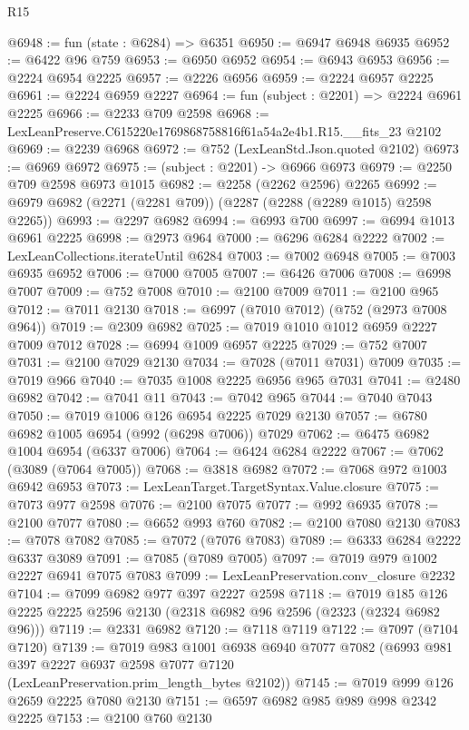 \begin{lexlean}{R15}
\begin{coremodule}
@6948 := fun (state : @6284) => @6351
@6950 := @6947 @6948 @6935
@6952 := @6422 @96 @759
@6953 := @6950 @6952
@6954 := @6943 @6953
@6956 := @2224 @6954 @2225
@6957 := @2226 @6956
@6959 := @2224 @6957 @2225
@6961 := @2224 @6959 @2227
@6964 := fun (subject : @2201) => @2224 @6961 @2225
@6966 := @2233 @709 @2598
@6968 := LexLeanPreserve.C615220e1769868758816f61a54a2e4b1.R15.__fits_23 @2102
@6969 := @2239 @6968
@6972 := @752 (LexLeanStd.Json.quoted @2102)
@6973 := @6969 @6972
@6975 := (subject : @2201) -> @6966 @6973
@6979 := @2250 @709 @2598 @6973 @1015
@6982 := @2258 (@2262 @2596) @2265
@6992 := @6979 @6982 (@2271 (@2281 @709)) (@2287 (@2288 (@2289 @1015) @2598 @2265))
@6993 := @2297 @6982
@6994 := @6993 @700
@6997 := @6994 @1013 @6961 @2225
@6998 := @2973 @964
@7000 := @6296 @6284 @2222
@7002 := LexLeanCollections.iterateUntil @6284
@7003 := @7002 @6948
@7005 := @7003 @6935 @6952
@7006 := @7000 @7005
@7007 := @6426 @7006
@7008 := @6998 @7007
@7009 := @752 @7008
@7010 := @2100 @7009
@7011 := @2100 @965
@7012 := @7011 @2130
@7018 := @6997 (@7010 @7012) (@752 (@2973 @7008 @964))
@7019 := @2309 @6982
@7025 := @7019 @1010 @1012 @6959 @2227 @7009 @7012
@7028 := @6994 @1009 @6957 @2225
@7029 := @752 @7007
@7031 := @2100 @7029 @2130
@7034 := @7028 (@7011 @7031) @7009
@7035 := @7019 @966
@7040 := @7035 @1008 @2225 @6956 @965 @7031
@7041 := @2480 @6982
@7042 := @7041 @11
@7043 := @7042 @965
@7044 := @7040 @7043
@7050 := @7019 @1006 @126 @6954 @2225 @7029 @2130
@7057 := @6780 @6982 @1005 @6954 (@992 (@6298 @7006)) @7029
@7062 := @6475 @6982 @1004 @6954 (@6337 @7006)
@7064 := @6424 @6284 @2222
@7067 := @7062 (@3089 (@7064 @7005))
@7068 := @3818 @6982
@7072 := @7068 @972 @1003 @6942 @6953
@7073 := LexLeanTarget.TargetSyntax.Value.closure
@7075 := @7073 @977 @2598
@7076 := @2100 @7075
@7077 := @992 @6935
@7078 := @2100 @7077
@7080 := @6652 @993 @760
@7082 := @2100 @7080 @2130
@7083 := @7078 @7082
@7085 := @7072 (@7076 @7083)
@7089 := @6333 @6284 @2222 @6337 @3089
@7091 := @7085 (@7089 @7005)
@7097 := @7019 @979 @1002 @2227 @6941 @7075 @7083
@7099 := LexLeanPreservation.conv_closure @2232
@7104 := @7099 @6982 @977 @397 @2227 @2598
@7118 := @7019 @185 @126 @2225 @2225 @2596 @2130 (@2318 @6982 @96 @2596 (@2323 (@2324 @6982 @96)))
@7119 := @2331 @6982
@7120 := @7118 @7119
@7122 := @7097 (@7104 @7120)
@7139 := @7019
    @983
    @1001
    @6938
    @6940
    @7077
    @7082
    (@6993 @981 @397 @2227 @6937 @2598 @7077 @7120 (LexLeanPreservation.prim_length_bytes @2102))
@7145 := @7019 @999 @126 @2659 @2225 @7080 @2130
@7151 := @6597 @6982 @985 @989 @998 @2342 @2225
@7153 := @2100 @760 @2130

\end{coremodule}
\end{lexlean}
